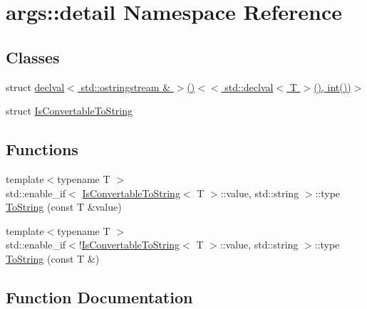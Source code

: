 \hypertarget{namespaceargs_1_1detail}{}\section{args\+:\+:detail Namespace Reference}
\label{namespaceargs_1_1detail}
\subsection*{Classes}
\begin{DoxyCompactItemize}
\item 
struct \hyperlink{structargs_1_1detail_1_1_is_convertable_to_string_3_01_t_00_01decltype_07std_1_1declval_3_01std_17020eddea127ea35668e82953e3d8bb}{declval$<$ std\+::ostringstream \& $>$()$<$$<$ std\+::declval$<$ T $>$(), int())$>$}
\item 
struct \hyperlink{structargs_1_1detail_1_1_is_convertable_to_string}{Is\+Convertable\+To\+String}
\end{DoxyCompactItemize}
\subsection*{Functions}
\begin{DoxyCompactItemize}
\item 
{\footnotesize template$<$typename T $>$ }\\std\+::enable\+\_\+if$<$ \hyperlink{structargs_1_1detail_1_1_is_convertable_to_string}{Is\+Convertable\+To\+String}$<$ T $>$\+::value, std\+::string $>$\+::type \hyperlink{namespaceargs_1_1detail_a987f64448788bc169c720bac728645ac}{To\+String} (const T \&value)
\item 
{\footnotesize template$<$typename T $>$ }\\std\+::enable\+\_\+if$<$!\hyperlink{structargs_1_1detail_1_1_is_convertable_to_string}{Is\+Convertable\+To\+String}$<$ T $>$\+::value, std\+::string $>$\+::type \hyperlink{namespaceargs_1_1detail_a4927ff5ca5c046d660c05fff3c7f3f1d}{To\+String} (const T \&)
\end{DoxyCompactItemize}


\subsection{Function Documentation}
\mbox{\label{namespaceargs_1_1detail_a987f64448788bc169c720bac728645ac}} 
